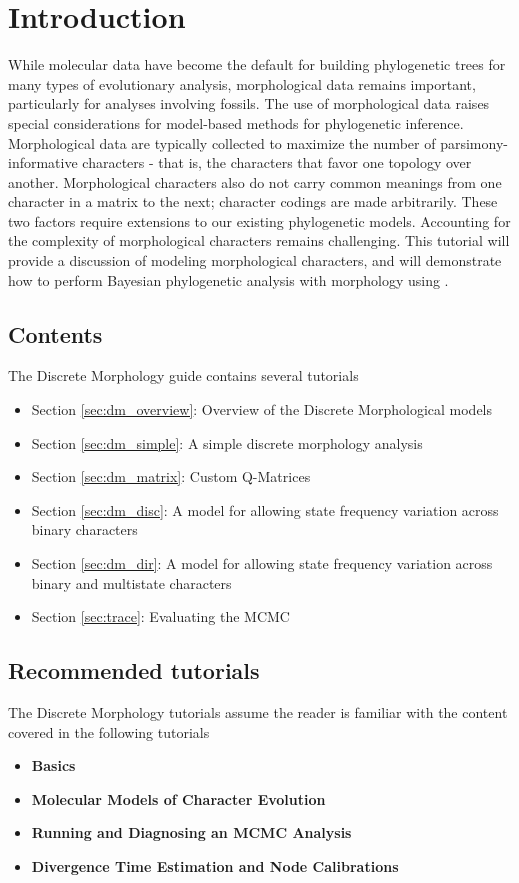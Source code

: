 \section{Introduction}

While molecular data have become the default for building phylogenetic trees for many types of evolutionary analysis, morphological data remains important, particularly for analyses involving fossils. The use of morphological data  raises special considerations for model-based methods for phylogenetic inference. Morphological data are typically collected to maximize the number of parsimony-informative characters -  that is, the characters that favor one topology over another.  Morphological characters also do not carry common meanings from one character in a matrix to the next; character codings are made arbitrarily. These two factors require extensions to our existing phylogenetic models. Accounting for the complexity of morphological characters remains challenging. This tutorial will provide a discussion of modeling morphological characters, and will demonstrate how to perform Bayesian phylogenetic analysis with morphology using \RevBayes. 

\subsection{Contents}

The Discrete Morphology guide contains several tutorials

\begin{itemize}
\item Section \ref{sec:dm_overview}: Overview of the Discrete Morphological models
\item Section \ref{sec:dm_simple}: A simple discrete morphology analysis
\item Section \ref{sec:dm_matrix}: Custom Q-Matrices
\item Section \ref{sec:dm_disc}: A model for allowing state frequency variation across binary characters
\item Section \ref{sec:dm_dir}: A model for allowing state frequency variation across binary and multistate characters
\item Section \ref{sec:trace}: Evaluating the MCMC \end{itemize}

\subsection{Recommended tutorials}

The Discrete Morphology tutorials assume the reader is familiar with the content covered in the following \RevBayes tutorials

\begin{itemize}
\item {\bf \Rev Basics}
\item {\bf Molecular Models of Character Evolution}
\item {\bf Running and Diagnosing an MCMC Analysis}
\item {\bf Divergence Time Estimation and Node Calibrations}
\end{itemize}

\newpage
